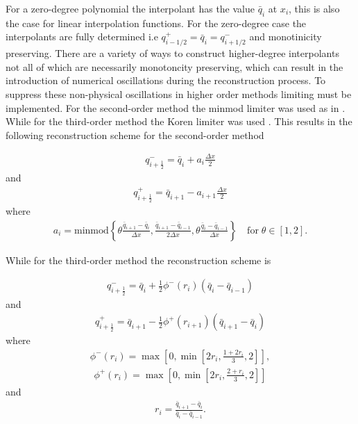 \documentclass[SingleSpace,12pt,Proceedings]{Serre_ASCE}
\begin{document}
For a zero-degree polynomial the interpolant has the value $\bar{q}_i$ at $x_i$, this is also the case for linear interpolation functions. For the zero-degree case the interpolants are fully determined i.e $q^{+}_{i - 1/2} = \bar{q}_i = q^{-}_{i+ 1/2}$ and monotinicity preserving. There are a variety of ways to construct higher-degree interpolants not all of which are necessarily monotoncity preserving, which can result in the introduction of numerical oscillations during the reconstruction process. To suppress these non-physical oscillations in higher order methods limiting must be implemented. For the second-order method the minmod limiter was used as in . While for the third-order method the Koren limiter was used \cite{Koren-1993}. This results in the following reconstruction scheme for the second-order method
\begin{linenomath*}
\begin{gather*}
q^-_{i + \frac{1}{2}} =  \bar{q}_i + a_i \frac{\Delta x}{2}
\end{gather*}
and
\begin{gather*}
q^+_{i + \frac{1}{2}} =  \bar{q}_{i+1} - a_{i + 1} \frac{\Delta x}{2}
\end{gather*}
where
\begin{gather*}
a_i = \text{minmod}\left\lbrace\theta \frac{\bar{q}_{i+1} - \bar{q}_{i}}{\Delta x}, \frac{\bar{q}_{i+1} - \bar{q}_{i-1}}{2\Delta x} ,\theta \frac{\bar{q}_{i} - \bar{q}_{i-1}}{\Delta x}\right\rbrace \quad \text{for} \; \theta \in \left[1,2\right].
\end{gather*}
\end{linenomath*}
While for the third-order method the reconstruction scheme is
\begin{linenomath*}
\begin{gather*}
q^-_{i + \frac{1}{2}} = \bar{q}_i + \frac{1}{2}\phi^-\left(r_i\right)\left(\bar{q}_i -\bar{q}_{i-1} \right)
\end{gather*}
and
\begin{gather*}
q^+_{i + \frac{1}{2}} = \bar{q}_{i+1} - \frac{1}{2}\phi^+\left(r_{i+1}\right)\left(\bar{q}_{i+1} -\bar{q}_{i} \right)
\end{gather*}
where
\begin{gather*}
\phi^-\left(r_i\right) = \max\left[0, \min\left[2 r_i, \frac{1 + 2r_i}{3},2\right]\right],
\end{gather*}
\begin{gather*}
\phi^+\left(r_i\right) = \max\left[0, \min\left[2 r_i, \frac{2 + r_i}{3},2\right]\right]
\end{gather*}
and
\begin{gather*}
r_i = \frac{\bar{q}_{i+1} - \bar{q}_{i} }{\bar{q}_{i} - \bar{q}_{i-1}}.
\end{gather*}
\end{linenomath*}
\end{document}
